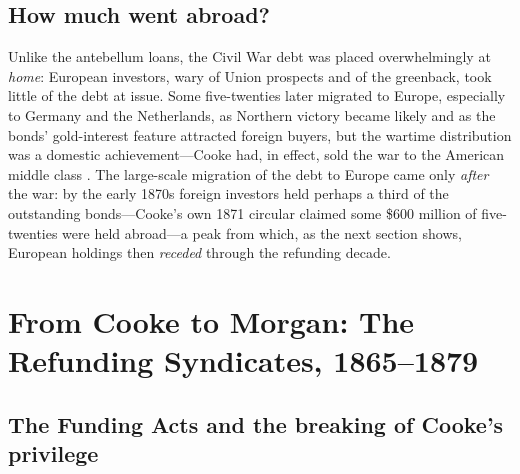\documentclass[12pt]{article}
\begin{document}
\subsection{How much went abroad?}

Unlike the antebellum loans, the Civil War debt was placed overwhelmingly at
\emph{home}: European investors, wary of Union prospects and of the greenback,
took little of the debt at issue. Some five-twenties later migrated to Europe,
especially to Germany and the Netherlands, as Northern victory became likely and
as the bonds' gold-interest feature attracted foreign buyers, but the wartime
distribution was a domestic achievement---Cooke had, in effect, sold the war to
the American middle class \citep{sexton2005debtor, hammond1970sovereignty}. The
large-scale migration of the debt to Europe came only \emph{after} the war: by
the early 1870s foreign investors held perhaps a third of the outstanding
bonds---Cooke's own 1871 circular claimed some \$600 million of five-twenties
were held abroad---a peak from which, as the next section shows, European
holdings then \emph{receded} through the refunding decade.

\section{From Cooke to Morgan: The Refunding Syndicates, 1865--1879}

\subsection{The Funding Acts and the breaking of Cooke's privilege}
\end{document}

